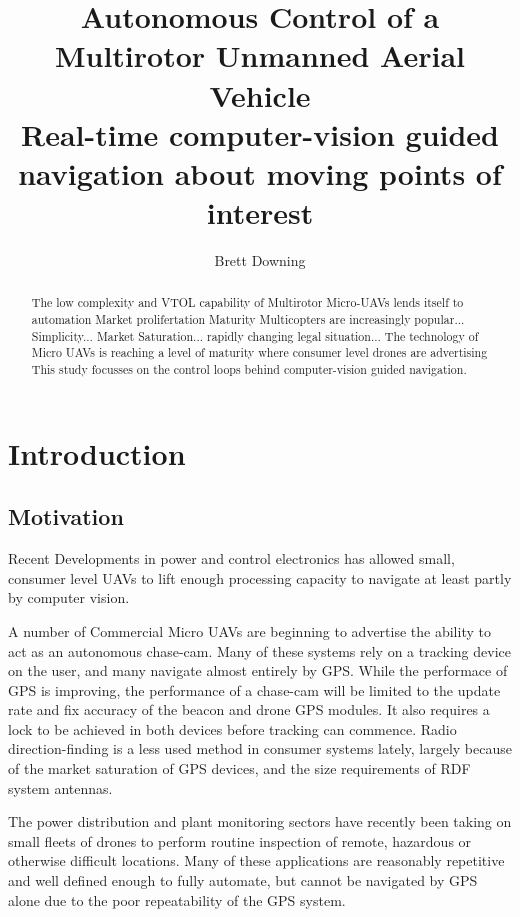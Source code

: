 \documentclass[a4paper, 11pt, titlepage]{article}
\title{Autonomous Control of a Multirotor Unmanned Aerial Vehicle\\
Real-time computer-vision guided navigation about moving points of interest}
\author{Brett Downing}
\date{}
\begin{document}
  \maketitle
  \begin{abstract}
    The low complexity and VTOL capability of Multirotor Micro-UAVs lends itself to automation
    Market prolifertation
    Maturity
    Multicopters are increasingly popular... Simplicity... Market Saturation... rapidly changing legal situation... 
    The technology of Micro UAVs is reaching a level of maturity where consumer level drones are advertising 
    This study focusses on the control loops behind computer-vision guided navigation. 

  \end{abstract}
  \tableofcontents

  \section{Introduction}
    \subsection{Motivation}
    Recent Developments in power and control electronics has allowed small, consumer level UAVs to lift enough processing capacity to navigate at least partly by computer vision.

    A number of Commercial Micro UAVs are beginning to advertise the ability to act as an autonomous chase-cam.  Many of these systems rely on a tracking device on the user, and many navigate almost entirely by GPS.  While the performace of GPS is improving, the performance of a chase-cam will be limited to the update rate and fix accuracy of the beacon and drone GPS modules.  It also requires a lock to be achieved in both devices before tracking can commence.
    Radio direction-finding is a less used method in consumer systems lately, largely because of the market saturation of GPS devices, and the size requirements of RDF system antennas.

    The power distribution and plant monitoring sectors have recently been taking on small fleets of drones to perform routine inspection of remote, hazardous or otherwise difficult locations.  Many of these applications are reasonably repetitive and well defined enough to fully automate, but cannot be navigated by GPS alone due to the poor repeatability of the GPS system. 
\end{document}
